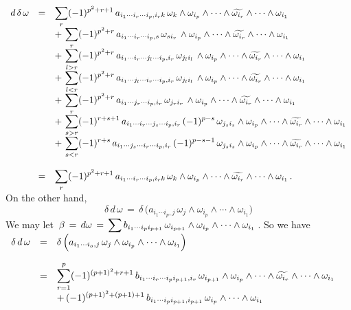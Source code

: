 \documentclass{article}[12pt,a4paper]
\begin{document}
$\begin{array}{rcl}
d\, \delta\, \omega &=& \displaystyle 
	\sum_r (-1)^{p^2+r+1}\, a_{i_1\cdots i_r\cdots i_p, i_rk}\,
	\omega_k \wedge \omega_{i_p}\wedge\cdots\wedge \widetilde{\omega_{i_r}} \wedge\cdots\wedge \omega_{i_1} \\[0.1in]
&& \displaystyle 
	+\, \sum_r (-1)^{p^2+r}\, a_{i_1\cdots i_r \cdots i_p,s}\, \omega_{si_r} \,
	\wedge \omega_{i_p}\wedge\cdots\wedge \widetilde{\omega_{i_r}} \wedge\cdots\wedge \omega_{i_1} \\[0.1in]
&& \displaystyle 
	+\, \sum_{l>r} (-1)^{p^2+r}\,  a_{i_1\cdots i_r \cdots  j_l\cdots  i_p,i_r}\, \omega_{j_l i_l} \,
	\wedge \omega_{i_p}\wedge\cdots\wedge \widetilde{\omega_{i_r}} \wedge\cdots\wedge \omega_{i_1} \\[0.1in]
&& \displaystyle 
	+\, \sum_{l<r} (-1)^{p^2+r}\,  a_{i_1 \cdots j_l \cdots i_r \cdots i_p,i_r}\, \omega_{j_l i_l} \,
	\wedge \omega_{i_p}\wedge\cdots\wedge \widetilde{\omega_{i_r}} \wedge\cdots\wedge \omega_{i_1} \\[0.1in]
&& \displaystyle 
	+\, \sum_r (-1)^{p^2+r}\,  a_{i_1 \cdots j_r \cdots i_p,i_r}\, \omega_{j_r i_r} \,
	\wedge \omega_{i_p}\wedge\cdots\wedge \widetilde{\omega_{i_r}} \wedge\cdots\wedge \omega_{i_1} \\[0.1in]
&& \displaystyle 
	+\, \sum_{s>r} (-1)^{r+s+1}\, a_{i_1\cdots i_r \cdots j_s \cdots i_p,i_r} \, (-1)^{p-s}\,
	\omega_{j_s i_s}  \wedge \omega_{i_p} \wedge\cdots\wedge \widetilde{\omega_{i_r}} \wedge\cdots\wedge \omega_{i_1} \\[0.1in]
&& \displaystyle 
	+\, \sum_{s<r} (-1)^{r+s}\, a_{i_1\cdots j_s \cdots  i_r\cdots i_p,i_r} \, (-1)^{p-s-1}\, 
	\omega_{j_s i_s}  \wedge \omega_{i_p} \wedge\cdots\wedge \widetilde{\omega_{i_r}} \wedge\cdots\wedge \omega_{i_1} \\[0.3in]
&=& \displaystyle 
	\sum_r (-1)^{p^2+r+1}\, a_{i_1\cdots i_r\cdots i_p, i_rk}\,
	\omega_k \wedge \omega_{i_p}\wedge\cdots\wedge \widetilde{\omega_{i_r}} \wedge\cdots\wedge \omega_{i_1}\,. \\
\end{array}$\\[0.1in]

On the other hand, 
$$ \delta \, d\, \omega \,=\, \delta\,\Big( a_{i_1\cdots i_p,j}\, \omega_j \wedge \omega_{i_p} \wedge\cdots\wedge \omega_{i_1}\Big) $$
We may let \,$\displaystyle \beta \,=\, d\omega \,=\, \sum b_{i_1\cdots i_p i_{p+1}}\, \omega_{i_{p+1}}\wedge 
\omega_{i_p} \wedge\cdots\wedge \omega_{i_1}$\,. So we have\\[0.1in]
$\begin{array}{rcl}
\delta \, d\, \omega &=& \displaystyle 
	\delta\,\Big( a_{i_1\cdots i_o,j}\, \omega_j \wedge \omega_{i_p} \wedge\cdots\wedge \omega_{i_1}\Big) \\[0.2in]
&=& \displaystyle 
	\sum_{r=1}^p (-1)^{(p+1)^2+r+1}\, b_{i_1\cdots i_r\cdots i_p i_{p+1}, i_r}\, 
	\omega_{i_{p+1}} \wedge \omega_{i_p} \wedge\cdots\wedge \widetilde{\omega_{i_r}} \wedge\cdots\wedge \omega_{i_1} \\[0.1in]
&& \displaystyle 
	+\, (-1)^{(p+1)^2+(p+1)+1}\, b_{i_1 \cdots i_p i_{p+1}, i_{p+1}}\,
	\omega_{i_p} \wedge\cdots\wedge \omega_{i_1} \\
\end{array}$ \\[0.1in]
\end{document}
